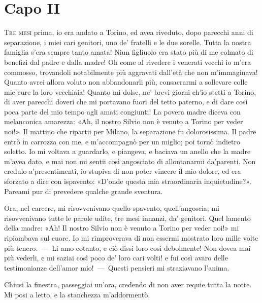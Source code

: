 
\chapter{Capo II}

\lettrine{T}{re mesi} prima, io era andato a Torino, ed avea riveduto, dopo parecchi
anni di separazione, i miei cari genitori, uno de' fratelli e le due
sorelle. Tutta la nostra famiglia s'era sempre tanto amata! Niun figliuolo
era stato più di me colmato di benefizi dal padre e dalla madre! Oh come al
rivedere i venerati vecchi io m'era commosso, trovandoli notabilmente più
aggravati dall'età che non m'immaginava! Quanto avrei allora voluto non
abbandonarli più, consacrarmi a sollevare colle mie cure la loro vecchiaia!
Quanto mi dolse, ne' brevi giorni ch'io stetti a Torino, di aver parecchi
doveri che mi portavano fuori del tetto paterno, e di dare così poca parte
del mio tempo agli amati congiunti! La povera madre diceva con melanconica
amarezza: «Ah, il nostro Silvio non è venuto a Torino per veder noi!». Il
mattino che ripartii per Milano, la separazione fu dolorosissima. Il padre
entrò in carrozza con me, e m'accompagnò per un miglio; poi tornò indietro
soletto. Io mi voltava a guardarlo, e piangeva, e baciava un anello che la
madre m'avea dato, e mai non mi sentii così angosciato di allontanarmi
da'parenti. Non credulo a'presentimenti, io stupiva di non poter vincere il
mio dolore, ed era sforzato a dire con ispavento: «D'onde questa mia
straordinaria inquietudine?». Pareami pur di prevedere qualche grande
sventura.

Ora, nel carcere, mi risovvenivano quello spavento, quell'angoscia; mi
risovvenivano tutte le parole udite, tre mesi innanzi, da' genitori. Quel
lamento della madre: «Ah! Il nostro Silvio non è venuto a Torino per veder
noi!» mi ripiombava sul cuore. Io mi rimproverava di non essermi mostrato
loro mille volte più tenero.~---~Li amo cotanto, e ciò dissi loro così
debolmente! Non dovea mai più vederli, e mi saziai così poco de' loro cari
volti! e fui così avaro delle testimonianze dell'amor mio!~---~Questi
pensieri mi straziavano l'anima.

Chiusi la finestra, passeggiai un'ora, credendo di non aver requie tutta la
notte. Mi posi a letto, e la stanchezza m'addormentò.
